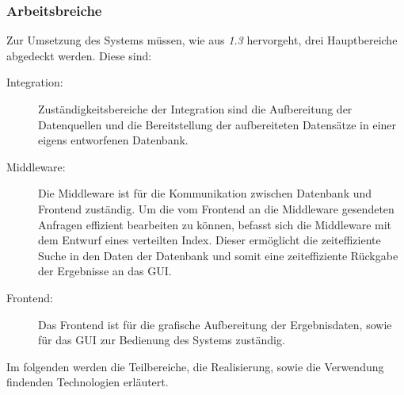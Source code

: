 \subsubsection{Arbeitsbreiche}
Zur Umsetzung des Systems müssen, wie aus \textit{1.3} hervorgeht, drei Hauptbereiche abgedeckt werden. Diese sind:

\begin{description}
\item[Integration:] Zuständigkeitsbereiche der Integration sind die Aufbereitung der Datenquellen und die Bereitstellung der aufbereiteten Datensätze in einer eigens entworfenen Datenbank.

\item[Middleware:] Die Middleware ist für die Kommunikation zwischen Datenbank und Frontend zuständig. Um die vom Frontend an die Middleware gesendeten Anfragen effizient bearbeiten zu können, befasst sich die Middleware mit dem Entwurf eines verteilten Index. Dieser ermöglicht die zeiteffiziente Suche in den Daten der Datenbank und somit eine zeiteffiziente Rückgabe der Ergebnisse an das GUI.

\item[Frontend:] Das Frontend ist für die grafische Aufbereitung der Ergebnisdaten, sowie für das GUI zur Bedienung des Systems zuständig.
\end{description}
Im folgenden werden die Teilbereiche, die Realisierung, sowie die Verwendung findenden Technologien erläutert.